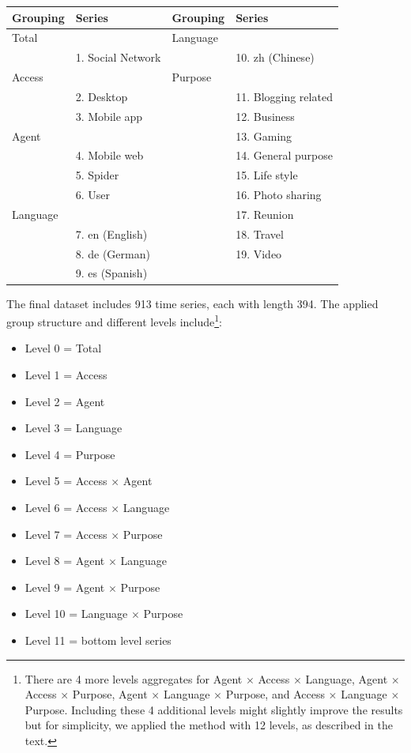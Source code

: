 \documentclass[11pt,a4paper,]{article}
\providecommand{\tightlist}{%
  \setlength{\itemsep}{0pt}\setlength{\parskip}{0pt}}
\let\origtable\table
\let\endorigtable\endtable
\renewenvironment{table}[1][2] {
    \expandafter\origtable\expandafter[!htbp]
} {
    \endorigtable
}
\begin{document}
\begin{table}[t]

\caption{\label{tab:wikipediagroupingstructure}Social networking Wikipedia article grouping structure}
\centering
\begin{tabular}{llll}
\toprule
Grouping & Series & Grouping & Series\\
\midrule
Total &  & Language & \\
 & 1. Social Network &  & 10. zh (Chinese)\\
Access &  & Purpose & \\
 & 2. Desktop &  & 11. Blogging related\\
 & 3. Mobile app &  & 12. Business\\
Agent &  &  & 13. Gaming\\
 & 4.  Mobile web &  & 14. General purpose\\
 & 5. Spider &  & 15. Life style\\
 & 6. User &  & 16. Photo sharing\\
Language &  &  & 17. Reunion\\
 & 7. en (English) &  & 18. Travel\\
 & 8. de (German) &  & 19. Video\\
 & 9. es (Spanish) &  & \\
\bottomrule
\end{tabular}
\end{table}

The final dataset includes 913 time series, each with length 394. The
applied group structure and different levels include\footnote{There are
  4 more levels aggregates for Agent \(\times\) Access \(\times\)
  Language, Agent \(\times\) Access \(\times\) Purpose, Agent \(\times\)
  Language \(\times\) Purpose, and Access \(\times\) Language \(\times\)
  Purpose. Including these 4 additional levels might slightly improve
  the results but for simplicity, we applied the method with 12 levels,
  as described in the text.}:

\begin{itemize}
\tightlist
\item
  Level 0 = Total
\item
  Level 1 = Access
\item
  Level 2 = Agent
\item
  Level 3 = Language
\item
  Level 4 = Purpose
\item
  Level 5 = Access \(\times\) Agent
\item
  Level 6 = Access \(\times\) Language
\item
  Level 7 = Access \(\times\) Purpose
\item
  Level 8 = Agent \(\times\) Language
\item
  Level 9 = Agent \(\times\) Purpose
\item
  Level 10 = Language \(\times\) Purpose
\item
  Level 11 = bottom level series
\end{itemize}
\end{document}
